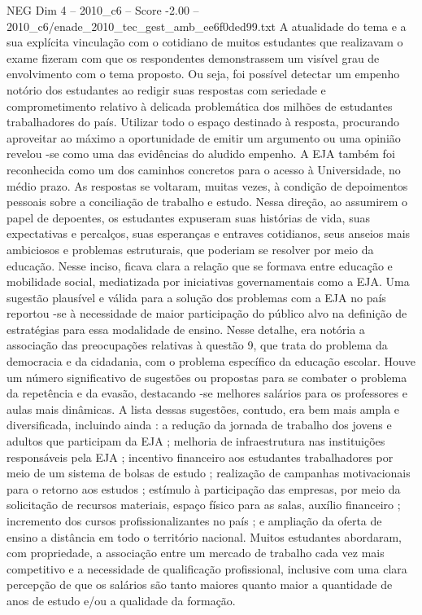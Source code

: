 \begin{textsample}{NEG Dim 4 – 2010\_c6 – Score -2.00 – 2010\_c6/enade\_2010\_tec\_gest\_amb\_ee6f0ded99.txt}
A atualidade do tema e a sua explícita vinculação com o cotidiano de muitos estudantes que realizavam o exame fizeram com que os respondentes demonstrassem um visível grau de envolvimento com o tema proposto.
Ou seja, foi possível detectar um empenho notório dos estudantes ao redigir suas respostas com seriedade e comprometimento relativo à delicada problemática dos milhões de estudantes trabalhadores do país.
Utilizar todo o espaço destinado à resposta, procurando aproveitar ao máximo a oportunidade de emitir um argumento ou uma opinião revelou -se como uma das evidências do aludido empenho.
A EJA também foi reconhecida como um dos caminhos concretos para o acesso à Universidade, no médio prazo.
As respostas se voltaram, muitas vezes, à condição de depoimentos pessoais sobre a conciliação de trabalho e estudo.
Nessa direção, ao assumirem o papel de depoentes, os estudantes expuseram suas histórias de vida, suas expectativas e percalços, suas esperanças e entraves cotidianos, seus anseios mais ambiciosos e problemas estruturais, que poderiam se resolver por meio da educação.
Nesse inciso, ficava clara a relação que se formava entre educação e mobilidade social, mediatizada por iniciativas governamentais como a EJA.
Uma sugestão plausível e válida para a solução dos problemas com a EJA no país reportou -se à necessidade de maior participação do público alvo na definição de estratégias para essa modalidade de ensino.
Nesse detalhe, era notória a associação das preocupações relativas à questão 9, que trata do problema da democracia e da cidadania, com o problema específico da educação escolar.
Houve um número significativo de sugestões ou propostas para se combater o problema da repetência e da evasão, destacando -se melhores salários para os professores e aulas mais dinâmicas.
A lista dessas sugestões, contudo, era bem mais ampla e diversificada, incluindo ainda : a redução da jornada de trabalho dos jovens e adultos que participam da EJA ; melhoria de infraestrutura nas instituições responsáveis pela EJA ; incentivo financeiro aos estudantes trabalhadores por meio de um sistema de bolsas de estudo ; realização de campanhas motivacionais para o retorno aos estudos ; estímulo à participação das empresas, por meio da solicitação de recursos materiais, espaço físico para as salas, auxílio financeiro ; incremento dos cursos profissionalizantes no país ; e ampliação da oferta de ensino a distância em todo o território nacional.
Muitos estudantes abordaram, com propriedade, a associação entre um mercado de trabalho cada vez mais competitivo e a necessidade de qualificação profissional, inclusive com uma clara percepção de que os salários são tanto maiores quanto maior a quantidade de anos de estudo e/ou a qualidade da formação.

\end{textsample}

